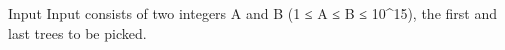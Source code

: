 Input
Input consists of two integers A and B (1 ≤ A ≤ B ≤ 10^15), the first and last trees to be picked.